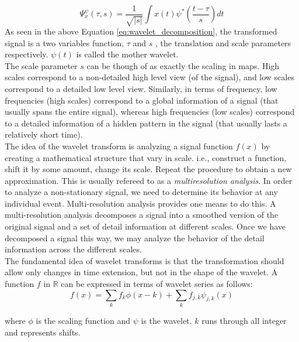 \documentclass[12pt,english]{report}
\begin{document}
\begin{equation}
\Psi^{\psi}_{x}(\tau, s)=\frac{1}{\sqrt{|s|}}\int{x(t)\psi^*(\frac{t-\tau}{s})dt}
\label{eq:wavelet_decomposition}
\end{equation}
As seen in the above Equation \ref{eq:wavelet_decomposition}, the transformed signal is a two variables function, $\tau$ and $s$ , the translation and scale parameters respectively. $\psi(t)$ is called the mother wavelet.\\

The scale parameter $s$ can be though of as exactly the scaling in maps. High scales correspond to a non-detailed high level view (of the signal), and low scales correspond to a detailed low level view. Similarly, in terms of frequency, low frequencies (high scales) correspond to a global information of a signal (that usually spans the entire signal), whereas high frequencies (low scales) correspond to a detailed information of a hidden pattern in the signal (that usually lasts a relatively short time).\\

The idea of the wavelet transform is analyzing a signal function $f(x)$ by creating a mathematical structure that vary in scale. i.e., construct a function, shift it by some amount, change its scale. Repeat the procedure to obtain a new approximation. This is usually refereed to as a \emph{multiresolution analysis}. In order to analyze a non-stationary signal, we need to determine its behavior at any individual event. Multi-resolution analysis provides one means to do this. A multi-resolution analysis decomposes a signal into a smoothed version of the original signal and a set of detail information at different scales. Once we have decomposed a signal this way, we may analyze the behavior of the detail information across the different scales.\\

The fundamental idea of wavelet transforms is that the transformation should allow only changes in time extension, but not in the shape of the wavelet. 
A function $f$ in $\mathbb{R}$ can be expressed in terms of wavelet series as follows:
\begin{equation}
f(x)=\sum\limits_{k}{f_k \phi(x-k)}+\sum\limits_{k}{f_{j,k}\psi_{j,k}(x)}
\end{equation}

where $\phi$ is the scaling function and $\psi$ is the wavelet. $k$ runs through all integer and represents shifts.\\
\end{document}
